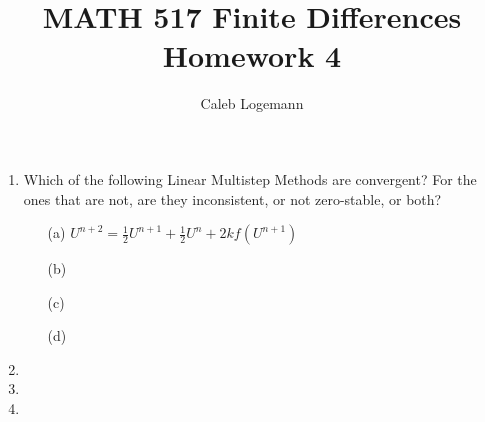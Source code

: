 \documentclass[11pt, oneside, titlepage]{article}
\title{MATH 517 Finite Differences Homework 4}
\author{Caleb Logemann}
\begin{document}
\maketitle

%
\begin{enumerate}
    \item %
        Which of the following Linear Multistep Methods are convergent?
        For the ones that are not, are they inconsistent, or not zero-stable,
        or both?
        \begin{enumerate}
            \item[(a)] $U^{n+2} = \frac{1}{2} U^{n+1} + \frac{1}{2}U^n + 2k f(U^{n+1})$
            \item[(b)]
            \item[(c)]
            \item[(d)]
        \end{enumerate}
    \item %
    \item %
    \item %
\end{enumerate}
\end{document}
